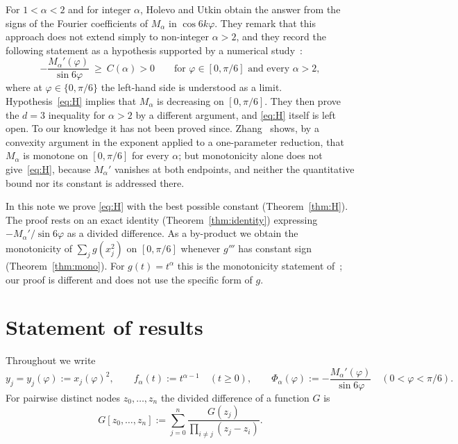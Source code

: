\documentclass[11pt]{amsart}
\theoremstyle{remark}
\begin{document}
For $1<\alpha<2$ and for integer $\alpha$, Holevo and Utkin obtain the answer from the
signs of the Fourier coefficients of $M_\alpha$ in $\cos 6k\varphi$. They remark that
this approach does not extend simply to non-integer $\alpha>2$, and they record the
following statement as a hypothesis supported by a numerical study~\cite[\S2]{HU}:
\begin{equation}\tag{H}\label{eq:H}
-\frac{M_\alpha'(\varphi)}{\sin 6\varphi}\ \ge\ C(\alpha)>0\qquad
\text{for }\varphi\in[0,\pi/6]\text{ and every }\alpha>2,
\end{equation}
where at $\varphi\in\{0,\pi/6\}$ the left-hand side is understood as a limit.
Hypothesis~\eqref{eq:H} implies that $M_\alpha$ is decreasing on $[0,\pi/6]$. They then
prove the $d=3$ inequality for $\alpha>2$ by a different argument, and \eqref{eq:H}
itself is left open. To our knowledge it has not been proved since. Zhang~\cite[Prop.~12(1)]{Z}
shows, by a convexity argument in the exponent applied to a one-parameter reduction, that
$M_\alpha$ is monotone on $[0,\pi/6]$ for every $\alpha$; but monotonicity alone does not
give~\eqref{eq:H}, because $M_\alpha'$ vanishes at both endpoints, and neither the
quantitative bound nor its constant is addressed there.

In this note we prove \eqref{eq:H} with the best possible constant
(Theorem~\ref{thm:H}). The proof rests on an exact identity (Theorem~\ref{thm:identity})
expressing $-M_\alpha'/\sin6\varphi$ as a divided difference. As a by-product we obtain
the monotonicity of $\sum_j g(x_j^2)$ on $[0,\pi/6]$ whenever $g'''$ has constant sign
(Theorem~\ref{thm:mono}). For $g(t)=t^\alpha$ this is the monotonicity statement
of~\cite[Prop.~12(1)]{Z}; our proof is different and does not use the specific form
of $g$.

\section{Statement of results}

Throughout we write
\[
y_j=y_j(\varphi):=x_j(\varphi)^2,\qquad f_\alpha(t):=t^{\alpha-1}\quad(t\ge0),
\qquad
\Phi_\alpha(\varphi):=-\frac{M_\alpha'(\varphi)}{\sin 6\varphi}\quad(0<\varphi<\pi/6).
\]
For pairwise distinct nodes $z_0,\dots,z_n$ the divided difference of a function $G$ is
\begin{equation}\label{eq:dd}
G[z_0,\dots,z_n]:=\sum_{j=0}^{n}\frac{G(z_j)}{\prod_{i\ne j}(z_j-z_i)} .
\end{equation}
\end{document}
